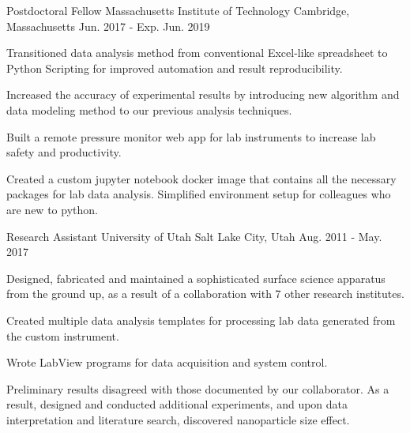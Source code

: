 


\begin{cventries}


\cventry
{Postdoctoral Fellow}
{Massachusetts Institute of Technology}
{Cambridge, Massachusetts}
{Jun. 2017 - Exp. Jun. 2019}
{
\begin{cvitems}
\item {Transitioned data analysis method from conventional Excel-like
    spreadsheet to Python Scripting for improved automation and result
    reproducibility.}
\item {Increased the accuracy of experimental results by introducing new
    algorithm and data modeling method to our previous analysis techniques.}
\item {Built a remote pressure monitor web app for lab instruments to increase
    lab safety and productivity.}
\item {Created a custom jupyter notebook docker image that contains all the
    necessary packages for lab data analysis. Simplified environment setup for
    colleagues who are new to python.}
\end{cvitems}
}


\cventry
{Research Assistant}
{University of Utah}
{Salt Lake City, Utah}
{Aug. 2011 - May. 2017}
{
\begin{cvitems}
\item {Designed, fabricated and maintained a sophisticated surface science
    apparatus from the ground up, as a result of a collaboration with 7 other
    research institutes.}
\item {Created multiple data analysis templates for processing lab data
    generated from the custom instrument.}
\item {Wrote LabView programs for data acquisition and system control.}
\item {Preliminary results disagreed with those documented by our collaborator.
    As a result, designed and conducted additional experiments, and upon data
    interpretation and literature search, discovered nanoparticle size effect.}
\end{cvitems}
}


\end{cventries}